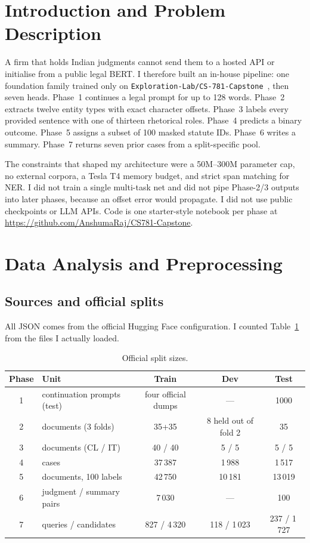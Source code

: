 \documentclass[11pt, oneside]{article}
\newcommand{\githuburl}{https://github.com/AnshumaRaj/CS781-Capstone}
\begin{document}
\section{Introduction and Problem Description}
A firm that holds Indian judgments cannot send them to a hosted API or initialise from a public legal BERT. I therefore built an in-house pipeline: one foundation family trained only on \texttt{Exploration-Lab/CS-781-Capstone}~\cite{cs781capstone}, then seven heads. Phase~1 continues a legal prompt for up to 128 words. Phase~2 extracts twelve entity types with exact character offsets. Phase~3 labels every provided sentence with one of thirteen rhetorical roles. Phase~4 predicts a binary outcome. Phase~5 assigns a subset of 100 masked statute IDs. Phase~6 writes a summary. Phase~7 returns seven prior cases from a split-specific pool.

The constraints that shaped my architecture were a 50M--300M parameter cap, no external corpora, a Tesla T4 memory budget, and strict span matching for NER. I did not train a single multi-task net and did not pipe Phase-2/3 outputs into later phases, because an offset error would propagate. I did not use public checkpoints or LLM APIs. Code is one starter-style notebook per phase at \url{\githuburl}.

\section{Data Analysis and Preprocessing}
\subsection{Sources and official splits}
All JSON comes from the official Hugging Face configuration. I counted Table~\ref{tab:splits} from the files I actually loaded.

\begin{table}[H]
\centering
\small
\caption{Official split sizes.}
\label{tab:splits}
\begin{tabular}{clccc}
\toprule
Phase & Unit & Train & Dev & Test \\
\midrule
1 & continuation prompts (test) & four official dumps & --- & 1000 \\
2 & documents (3 folds) & 35+35 & 8 held out of fold 2 & 35 \\
3 & documents (CL / IT) & 40 / 40 & 5 / 5 & 5 / 5 \\
4 & cases & 37\,387 & 1\,988 & 1\,517 \\
5 & documents, 100 labels & 42\,750 & 10\,181 & 13\,019 \\
6 & judgment / summary pairs & 7\,030 & --- & 100 \\
7 & queries / candidates & 827 / 4\,320 & 118 / 1\,023 & 237 / 1\,727 \\
\bottomrule
\end{tabular}
\end{table}
\end{document}
